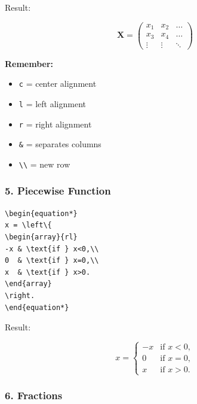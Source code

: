 \documentclass[a4paper,10pt]{article}
\begin{document}
Result:

\begin{equation*}
\mathbf{X}= \left(
\begin{array}{ccc}
x_1 & x_2 & \ldots \\
x_3 & x_4 & \ldots \\
\vdots & \vdots & \ddots
\end{array}
\right)
\end{equation*}

\textbf{Remember:}

\begin{itemize}
    \item \texttt{c} = center alignment
    \item \texttt{l} = left alignment
    \item \texttt{r} = right alignment
    \item \texttt{\&} = separates columns
    \item \texttt{\textbackslash\textbackslash} = new row
\end{itemize}


\subsubsection{5. Piecewise Function}

\begin{verbatim}
\begin{equation*}
x = \left\{
\begin{array}{rl}
-x & \text{if } x<0,\\
0  & \text{if } x=0,\\
x  & \text{if } x>0.
\end{array}
\right.
\end{equation*}
\end{verbatim}

Result:

\begin{equation*}
x = \left\{
\begin{array}{rl}
-x & \text{if } x<0,\\
0  & \text{if } x=0,\\
x  & \text{if } x>0.
\end{array}
\right.
\end{equation*}


\subsubsection{6. Fractions}
\end{document}
